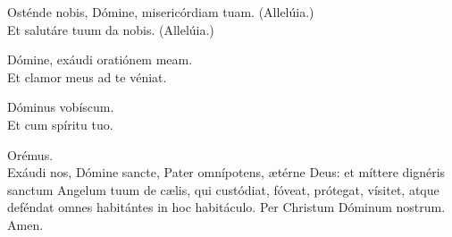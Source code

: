 \begin{multicols}{2}
	\setlength{\parskip}{0.5em}
	\V Osténde nobis, Dómine, misericórdiam tuam. (Allelúia.)\\
	\R Et salutáre tuum da nobis. (Allelúia.)

	\V Dómine, exáudi oratiónem meam.\\
	\R Et clamor meus ad te véniat.

	\V Dóminus vobíscum.\\
	\R Et cum spíritu tuo.

	Orémus.\\
	Exáudi nos, Dómine sancte, Pater omnípotens, \ae{}térne Deus:
	et míttere dignéris sanctum Angelum tuum de c\ae{}lis, qui custódiat,
	fóveat, prótegat, vísitet, atque deféndat omnes habitántes in hoc habitáculo.
	Per Christum Dóminum nostrum.\\
	\R Amen.
\end{multicols}
%
%
%
%
%
%
